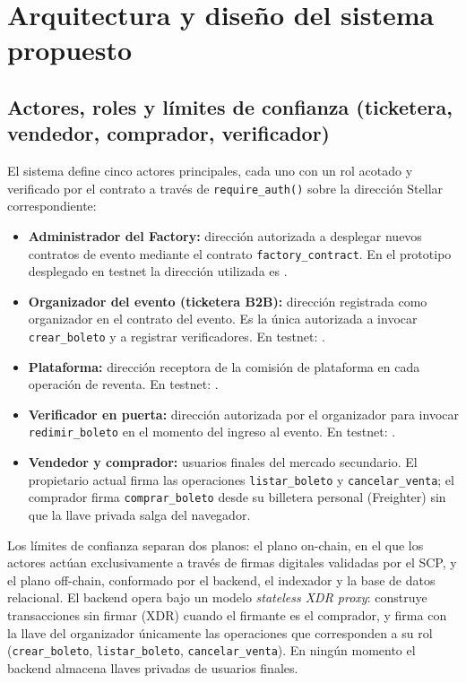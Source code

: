\newpage
\section{Arquitectura y diseño del sistema propuesto}

\subsection{Actores, roles y límites de confianza (ticketera, vendedor, comprador, verificador)}

El sistema define cinco actores principales, cada uno con un rol acotado y verificado por el contrato a través de \texttt{require\_auth()} sobre la dirección Stellar correspondiente:

\begin{itemize}
    \item \textbf{Administrador del Factory:} dirección autorizada a desplegar nuevos contratos de evento mediante el contrato \texttt{factory\_contract}. En el prototipo desplegado en testnet la dirección utilizada es .
    \item \textbf{Organizador del evento (ticketera B2B):} dirección registrada como organizador en el contrato del evento. Es la única autorizada a invocar \texttt{crear\_boleto} y a registrar verificadores. En testnet: .
    \item \textbf{Plataforma:} dirección receptora de la comisión de plataforma en cada operación de reventa. En testnet: .
    \item \textbf{Verificador en puerta:} dirección autorizada por el organizador para invocar \texttt{redimir\_boleto} en el momento del ingreso al evento. En testnet: .
    \item \textbf{Vendedor y comprador:} usuarios finales del mercado secundario. El propietario actual firma las operaciones \texttt{listar\_boleto} y \texttt{cancelar\_venta}; el comprador firma \texttt{comprar\_boleto} desde su billetera personal (Freighter) sin que la llave privada salga del navegador.
\end{itemize}

Los límites de confianza separan dos planos: el plano on-chain, en el que los actores actúan exclusivamente a través de firmas digitales validadas por el SCP, y el plano off-chain, conformado por el backend, el indexador y la base de datos relacional. El backend opera bajo un modelo \textit{stateless XDR proxy}: construye transacciones sin firmar (XDR) cuando el firmante es el comprador, y firma con la llave del organizador únicamente las operaciones que corresponden a su rol (\texttt{crear\_boleto}, \texttt{listar\_boleto}, \texttt{cancelar\_venta}). En ningún momento el backend almacena llaves privadas de usuarios finales.

